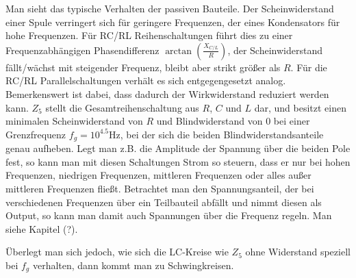 Man sieht das typische Verhalten der passiven Bauteile. Der Scheinwiderstand einer Spule verringert 
sich für geringere Frequenzen, der eines Kondensators für hohe Frequenzen.
Für RC/RL Reihenschaltungen führt dies zu einer Frequenzabhängigen Phasendifferenz $\arctan(\tfrac{X_{C/L}}{R})$, der Scheinwiderstand fällt/wächst mit steigender Frequenz, bleibt aber strikt größer als $R$.
Für die RC/RL Parallelschaltungen verhält es sich entgegengesetzt analog.
Bemerkenswert ist dabei, dass dadurch der Wirkwiderstand reduziert werden kann.
$Z_5$ stellt die Gesamtreihenschaltung aus $R$, $C$ und $L$ dar, und besitzt einen minimalen Scheinwiderstand von $R$ und Blindwiderstand von $0$ bei einer Grenzfrequenz $f_g = 10^{4.5}\si{\hertz}$, bei der sich die beiden Blindwiderstandsanteile genau aufheben.
Legt man z.B. die Amplitude der Spannung über die beiden Pole fest, so kann man mit diesen Schaltungen Strom so steuern, dass er nur bei hohen Frequenzen, niedrigen Frequenzen, mittleren Frequenzen oder alles außer mittleren Frequenzen fließt. Betrachtet man den Spannungsanteil, der bei verschiedenen Frequenzen über ein Teilbauteil abfällt und nimmt diesen als Output, so kann man damit auch Spannungen über die Frequenz regeln. Man siehe Kapitel (?).

Überlegt man sich jedoch, wie sich die LC-Kreise wie $Z_5$ ohne Widerstand speziell bei $f_g$ verhalten, dann kommt man zu Schwingkreisen.

